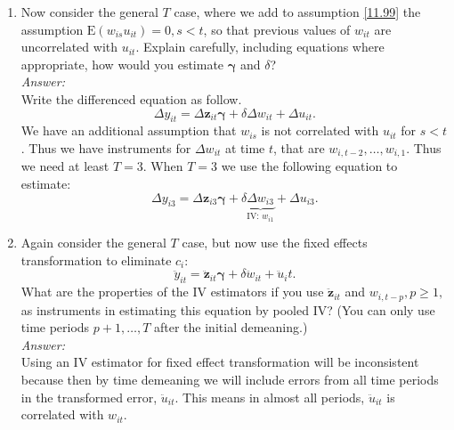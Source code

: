 \documentclass[10pt]{article}
\newcommand{\E}{\text{E}}
\begin{document}
\begin{enumerate}[label=\alph*.]
\item Now consider the general $T$ case, where we add to assumption \eqref{11.99} the assumption $\E(w_{is}u_{it})=0,s<t$, so that previous values of $w_{it}$ are uncorrelated with $u_{it}$. Explain carefully, including equations where appropriate, how would you estimate $\pmb{\gamma}$ and $\delta$?
\\ \textit{Answer:}\\
Write the differenced equation as follow.
\[\Delta y_{it}=\Delta \textbf{z}_{it}\pmb{\gamma}+\delta \Delta w_{it}+\Delta u_{it}.\]
We have an additional assumption that $w_{is}$ is not correlated with $u_{it}$ for $s<t$. Thus we have instruments for $\Delta w_{it}$ at time $t$, that are $w_{i,t-2},\ldots,w_{i,1}$. Thus we need at least $T=3$. When $T=3$ we use the following equation to estimate:
\[\Delta y_{i3}=\Delta \textbf{z}_{i3}\pmb{\gamma}+\delta \underbrace{\Delta w_{i3}}_{\displaystyle \text{IV: } w_{i1}}+\Delta u_{i3}.\]


\item Again consider the general $T$ case, but now use the fixed effects transformation to eliminate $c_i$:
\[\ddot{y}_{it}=\ddot{\textbf{z}}_{it}\pmb{\gamma}+\delta \ddot{w}_{it}+\ddot{u}_it.\]
What are the properties of the IV estimators if you use $\ddot{\textbf{z}}_{it}$ and $w_{i,t-p},p\geq 1,$ as instruments in estimating this equation by pooled IV? (You can only use time periods $p+1,\ldots,T$ after the initial demeaning.)
\\ \textit{Answer:}\\
Using an IV estimator for fixed effect transformation will be inconsistent because then by time demeaning we will include errors from all time periods in the transformed error, $\ddot{u}_{it}$. This means in almost all periods, $\ddot{u}_{it}$ is correlated with $w_{it}$.
\end{enumerate}
\end{document}
